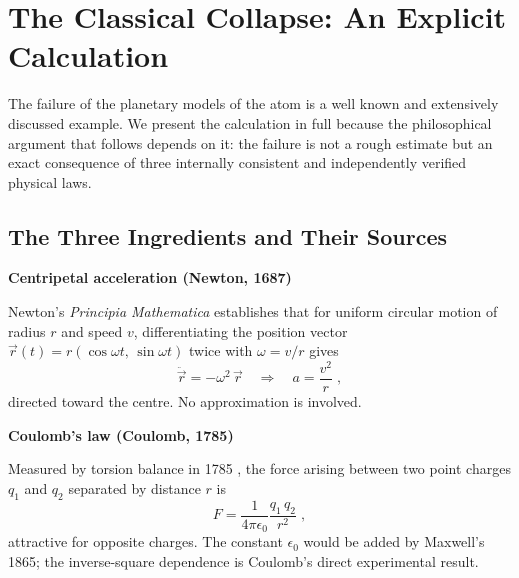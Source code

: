 \section{The Classical Collapse: An Explicit Calculation}
\label{section:collapse}

The failure of the planetary models of the atom is a well known and extensively discussed example. We present the calculation in full because the philosophical argument that follows depends on it: the failure is not a rough estimate but an exact consequence of three internally consistent and independently verified physical laws.

\subsection{The Three Ingredients and Their Sources}
\label{subsection:ingredients}

\textbf{Centripetal acceleration (Newton, 1687)}

\medskip

Newton's \textit{Principia Mathematica} \cite{newton_1687_principia} establishes that for uniform circular motion of radius $r$ and speed $v$, differentiating the position vector $\vec{r}(t) = r(\cos\omega t,\,\sin\omega t)$ twice with $\omega = v/r$ gives
\begin{equation}
  \ddot{\vec{r}} = -\omega^2\,\vec{r} \quad\Longrightarrow\quad \boxed{a = \frac{v^2}{r}} \; ,
  \label{eq:centripetal}
\end{equation}
directed toward the centre. No approximation is involved.

\medskip

\textbf{Coulomb's law (Coulomb, 1785)}

\medskip

Measured by torsion balance in 1785 \cite{coulomb_1785_electricity}, the force arising between two point charges $q_1$ and $q_2$ separated by distance $r$ is
\begin{equation}
  \boxed{F = \frac{1}{4\pi\epsilon_0}\frac{q_1\,q_2}{r^2}} \; ,
  \label{eq:coulomb}
\end{equation}
attractive for opposite charges. The constant $\epsilon_0$ would be added by Maxwell's 1865; the inverse-square dependence is Coulomb's direct experimental result.

